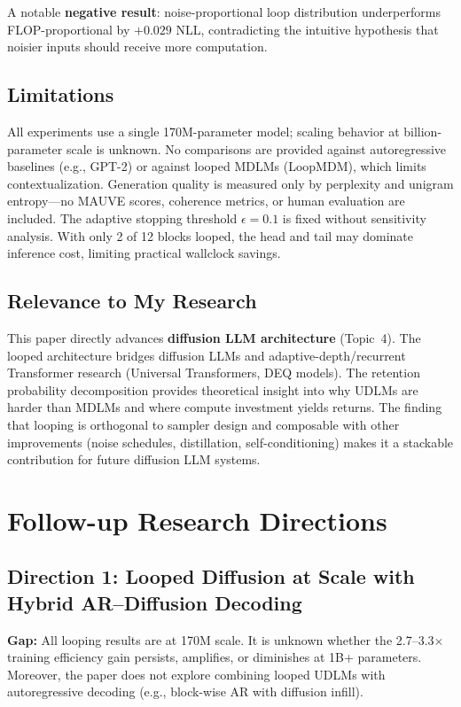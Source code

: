 \documentclass[11pt,a4paper]{article}
\begin{document}
A notable \textbf{negative result}: noise-proportional loop distribution underperforms FLOP-proportional by $+0.029$ NLL, contradicting the intuitive hypothesis that noisier inputs should receive more computation.

\subsection{Limitations}
All experiments use a single 170M-parameter model; scaling behavior at billion-parameter scale is unknown. No comparisons are provided against autoregressive baselines (e.g., GPT-2) or against looped MDLMs (LoopMDM), which limits contextualization. Generation quality is measured only by perplexity and unigram entropy---no MAUVE scores, coherence metrics, or human evaluation are included. The adaptive stopping threshold $\epsilon = 0.1$ is fixed without sensitivity analysis. With only 2 of 12 blocks looped, the head and tail may dominate inference cost, limiting practical wallclock savings.

\subsection{Relevance to My Research}
This paper directly advances \textbf{diffusion LLM architecture} (Topic~4). The looped architecture bridges diffusion LLMs and adaptive-depth/recurrent Transformer research (Universal Transformers, DEQ models). The retention probability decomposition provides theoretical insight into why UDLMs are harder than MDLMs and where compute investment yields returns. The finding that looping is orthogonal to sampler design and composable with other improvements (noise schedules, distillation, self-conditioning) makes it a stackable contribution for future diffusion LLM systems.

\section{Follow-up Research Directions}

\subsection{Direction 1: Looped Diffusion at Scale with Hybrid AR--Diffusion Decoding}
\textbf{Gap:} All looping results are at 170M scale. It is unknown whether the 2.7--3.3$\times$ training efficiency gain persists, amplifies, or diminishes at 1B+ parameters. Moreover, the paper does not explore combining looped UDLMs with autoregressive decoding (e.g., block-wise AR with diffusion infill).
\end{document}
